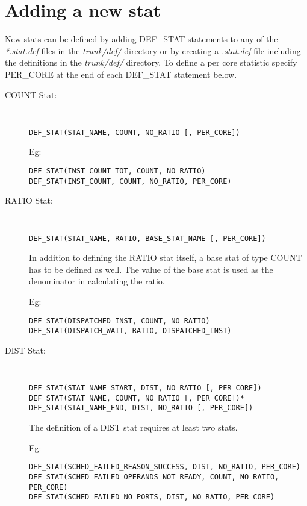 \section{Adding a new stat}

New stats can be defined by adding DEF\_STAT statements to any of the
\textit{*.stat.def} files in the \textit{trunk/def/} directory or by creating a
\textit{.stat.def} file including the definitions in the \textit{trunk/def/}
directory.  To define a per core statistic specify PER\_CORE at the
end of each DEF\_STAT statement below.



\begin{description}

\item[COUNT Stat:] \Verb+ +

\Verb+DEF_STAT(STAT_NAME, COUNT, NO_RATIO [, PER_CORE])+

Eg: 
\begin{Verbatim}
DEF_STAT(INST_COUNT_TOT, COUNT, NO_RATIO)
DEF_STAT(INST_COUNT, COUNT, NO_RATIO, PER_CORE)
\end{Verbatim}

\item[RATIO Stat:] \Verb+ +

\Verb+DEF_STAT(STAT_NAME, RATIO, BASE_STAT_NAME [, PER_CORE])+


In addition to defining the RATIO stat itself, a base stat of type COUNT has to
be defined as well. The value of the base stat is used as the denominator in
calculating the ratio. 

Eg: 
\begin{Verbatim}
DEF_STAT(DISPATCHED_INST, COUNT, NO_RATIO)
DEF_STAT(DISPATCH_WAIT, RATIO, DISPATCHED_INST)
\end{Verbatim}

\item[DIST Stat:] \Verb+ +

\begin{Verbatim}
DEF_STAT(STAT_NAME_START, DIST, NO_RATIO [, PER_CORE])
DEF_STAT(STAT_NAME, COUNT, NO_RATIO [, PER_CORE])*
DEF_STAT(STAT_NAME_END, DIST, NO_RATIO [, PER_CORE])
\end{Verbatim}

The definition of a DIST stat requires at least two stats.

Eg: 
\begin{Verbatim}
DEF_STAT(SCHED_FAILED_REASON_SUCCESS, DIST, NO_RATIO, PER_CORE)
DEF_STAT(SCHED_FAILED_OPERANDS_NOT_READY, COUNT, NO_RATIO, PER_CORE)
DEF_STAT(SCHED_FAILED_NO_PORTS, DIST, NO_RATIO, PER_CORE)
\end{Verbatim}

\end{description}


